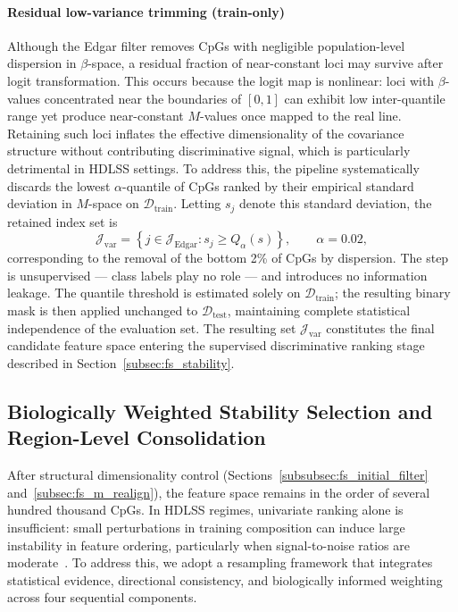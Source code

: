 \paragraph{Residual low-variance trimming (train-only)}

Although the Edgar filter removes CpGs with negligible population-level
dispersion in $\beta$-space, a residual fraction of near-constant loci may
survive after logit transformation. This occurs because the logit map is
nonlinear: loci with $\beta$-values concentrated near the boundaries of $[0,1]$
can exhibit low inter-quantile range yet produce near-constant $M$-values once
mapped to the real line. Retaining such loci inflates the effective dimensionality
of the covariance structure without contributing discriminative signal, which
is particularly detrimental in HDLSS settings.
To address this, the pipeline systematically discards the lowest
$\alpha$-quantile of CpGs ranked by their empirical standard deviation in
$M$-space on $\mathcal{D}_{\mathrm{train}}$. Letting $s_j$ denote this
standard deviation, the retained index set is
\begin{equation}
    \mathcal{J}_{\mathrm{var}}
    =
    \left\{
        j \in \mathcal{J}_{\mathrm{Edgar}} :
        s_j \geq Q_{\alpha}(s)
    \right\},
    \qquad
    \alpha = 0.02,
\end{equation}
corresponding to the removal of the bottom 2\% of CpGs by dispersion.
The step is unsupervised — class labels play no role — and introduces no
information leakage. The quantile threshold is estimated solely on
$\mathcal{D}_{\mathrm{train}}$; the resulting binary mask is then applied
unchanged to $\mathcal{D}_{\mathrm{test}}$, maintaining complete statistical
independence of the evaluation set.
The resulting set $\mathcal{J}_{\mathrm{var}}$ constitutes the final candidate
feature space entering the supervised discriminative ranking stage described
in Section~\ref{subsec:fs_stability}.

\subsection{Biologically Weighted Stability Selection and Region-Level Consolidation}
\label{subsec:fs_stability_ranking}

After structural dimensionality control 
(Sections~\ref{subsubsec:fs_initial_filter} 
and~\ref{subsec:fs_m_realign}), the feature space remains 
in the order of several hundred thousand CpGs. In HDLSS 
regimes, univariate ranking alone is insufficient: small 
perturbations in training composition can induce large 
instability in feature ordering, particularly when 
signal-to-noise ratios are 
moderate~\cite{Hall2005, Donoho2000}. To address this, we 
adopt a resampling framework that integrates statistical 
evidence, directional consistency, and biologically informed 
weighting across four sequential components.

